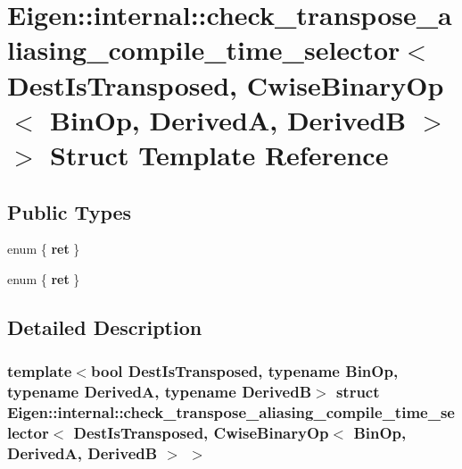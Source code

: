 \hypertarget{struct_eigen_1_1internal_1_1check__transpose__aliasing__compile__time__selector_3_01_dest_is_tra9f4c4ffc0d2b0b4cca6adac98dc1ed17}{}\section{Eigen\+:\+:internal\+:\+:check\+\_\+transpose\+\_\+aliasing\+\_\+compile\+\_\+time\+\_\+selector$<$ Dest\+Is\+Transposed, Cwise\+Binary\+Op$<$ Bin\+Op, DerivedA, DerivedB $>$ $>$ Struct Template Reference}
\label{struct_eigen_1_1internal_1_1check__transpose__aliasing__compile__time__selector_3_01_dest_is_tra9f4c4ffc0d2b0b4cca6adac98dc1ed17}
\subsection*{Public Types}
\begin{DoxyCompactItemize}
\item 
\mbox{\label{struct_eigen_1_1internal_1_1check__transpose__aliasing__compile__time__selector_3_01_dest_is_tra9f4c4ffc0d2b0b4cca6adac98dc1ed17_a5c8b8b46435792a32fa220a7357bfa98}} 
enum \{ {\bfseries ret}
 \}
\item 
\mbox{\label{struct_eigen_1_1internal_1_1check__transpose__aliasing__compile__time__selector_3_01_dest_is_tra9f4c4ffc0d2b0b4cca6adac98dc1ed17_aaf4c2948c7a4cf4d076b456910c60b55}} 
enum \{ {\bfseries ret}
 \}
\end{DoxyCompactItemize}


\subsection{Detailed Description}
\subsubsection*{template$<$bool Dest\+Is\+Transposed, typename Bin\+Op, typename DerivedA, typename DerivedB$>$\newline
struct Eigen\+::internal\+::check\+\_\+transpose\+\_\+aliasing\+\_\+compile\+\_\+time\+\_\+selector$<$ Dest\+Is\+Transposed, Cwise\+Binary\+Op$<$ Bin\+Op, Derived\+A, Derived\+B $>$ $>$}



